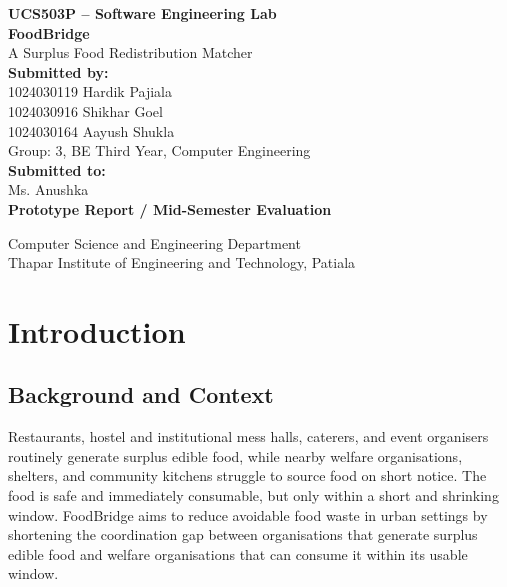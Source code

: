 \documentclass[12pt,a4paper]{report}
\title{}
\date{}
\begin{document}
\begin{titlepage}
\centering
\vspace*{1cm}
{\Large \textbf{UCS503P -- Software Engineering Lab}}\\[1.5cm]

{\Huge \textbf{FoodBridge}}\\[0.5cm]
{\Large A Surplus Food Redistribution Matcher}\\[2cm]

{\large \textbf{Submitted by:}}\\[0.3cm]
1024030119 \quad Hardik Pajiala\\
1024030916 \quad Shikhar Goel\\
1024030164 \quad Aayush Shukla\\[0.6cm]
Group: 3, BE Third Year, Computer Engineering\\[1.5cm]

{\large \textbf{Submitted to:}}\\[0.3cm]
Ms. Anushka\\[1.5cm]
{\large \textbf{Prototype Report / Mid-Semester Evaluation}}\\[0.5cm]

\vfill

Computer Science and Engineering Department\\
Thapar Institute of Engineering and Technology, Patiala

\end{titlepage}

\tableofcontents
\clearpage

\chapter{Introduction}

\section{Background and Context}

Restaurants, hostel and institutional mess halls, caterers, and event organisers routinely generate surplus edible food, while nearby welfare organisations, shelters, and community kitchens struggle to source food on short notice. The food is safe and immediately consumable, but only within a short and shrinking window. FoodBridge aims to reduce avoidable food waste in urban settings by shortening the coordination gap between organisations that generate surplus edible food and welfare organisations that can consume it within its usable window.
\end{document}
